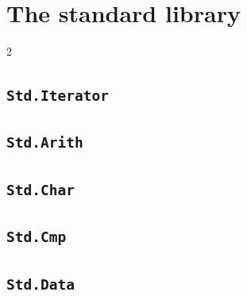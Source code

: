 \chapter{The standard library}

\begin{multicols*}{2}

\section{\texttt{Std.Iterator}}

\section{\texttt{Std.Arith}}

\section{\texttt{Std.Char}}

\section{\texttt{Std.Cmp}}

\section{\texttt{Std.Data}}

\end{multicols*}
